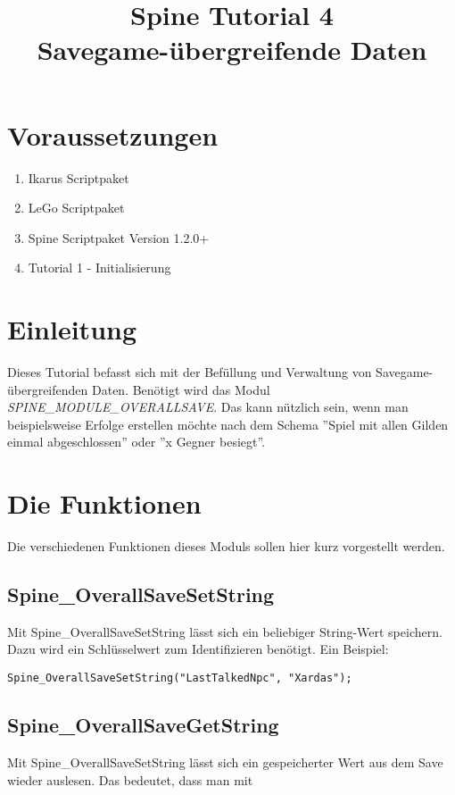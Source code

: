 \documentclass{article}
\title{Spine Tutorial 4 \\ Savegame-übergreifende Daten}
\begin{document}
\section{Voraussetzungen}

\begin{enumerate}
\item Ikarus Scriptpaket
\item LeGo Scriptpaket
\item Spine Scriptpaket Version 1.2.0+
\item Tutorial 1 - Initialisierung
\end{enumerate}

\section{Einleitung}

Dieses Tutorial befasst sich mit der Befüllung und Verwaltung von Savegame-übergreifenden Daten. Benötigt wird das Modul \textit{SPINE\_MODULE\_OVERALLSAVE}. Das kann nützlich sein, wenn man beispielsweise Erfolge erstellen möchte nach dem Schema ''Spiel mit allen Gilden einmal abgeschlossen'' oder ''x Gegner besiegt''.

\section{Die Funktionen}

Die verschiedenen Funktionen dieses Moduls sollen hier kurz vorgestellt werden.

\subsection{Spine\_OverallSaveSetString}

Mit Spine\_OverallSaveSetString lässt sich ein beliebiger String-Wert speichern. Dazu wird ein Schlüsselwert zum Identifizieren benötigt. Ein Beispiel:

\begin{lstlisting}
Spine_OverallSaveSetString("LastTalkedNpc", "Xardas");
\end{lstlisting}

\subsection{Spine\_OverallSaveGetString}

Mit Spine\_OverallSaveSetString lässt sich ein gespeicherter Wert aus dem Save wieder auslesen. Das bedeutet, dass man mit
\end{document}
